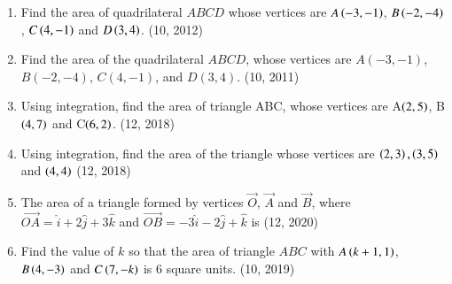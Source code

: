 \begin{enumerate}[label=\thesubsection.\arabic*,ref=\thesubsection.\theenumi]
\item Find the area of quadrilateral $ABCD$ whose vertices are $A\left(-3,-1\right)$, $B\left(-2,-4\right)$, $C\left(4,-1\right)$ and $D\left(3,4\right)$.
\hfill (10, 2012)
\item Find the area of the quadrilateral $ABCD$, whose vertices are $A(-3, -1)$, $B(-2, -4)$, $C(4, -1)$, and $D(3, 4)$.
\hfill (10, 2011)
\item Using integration, find the area of triangle ABC, whose vertices are A$\left(2, 5\right)$, B$\left(4, 7\right)$ and C$\left(6, 2\right)$.
\hfill (12, 2018)
\item Using integration, find the area of the triangle whose vertices are $\left(2,3\right),\left(3,5\right)$ and $\left(4,4\right)$
\hfill (12, 2018)
\item The area of a triangle formed by vertices $\vec{O}$, $\vec{A}$ and $\vec{B}$, where $\overrightarrow{OA}= \hat{i}+2 \hat{j}+3\hat{k}$ and $\overrightarrow{OB}= -3\hat{i} - 2\hat{j} + \hat{k}$ is
\hfill (12, 2020)
\item Find the value of $k$ so that the area of triangle $ABC$ with $A\left(k + 1, 1\right)$, $B\left(4, -3\right)$ and $C\left(7, -k\right)$ is $6$ square units.
\hfill (10, 2019)

\end{enumerate}

